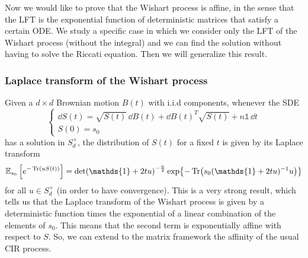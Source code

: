  Now we would like to prove that the Wishart process is affine, in the sense that the LFT is the exponential function of deterministic matrices that satisfy a certain ODE. We study a specific case in which we consider only the LFT of the Wishart process (without the integral) and we can find the solution without having to solve the Riccati equation. Then we will generalize this result.\\

\subsubsection{Laplace transform of the Wishart process}
Given a $d\times d$ Brownian motion $B(t)$ with i.i.d components, whenever the SDE
\begin{equation}
    \begin{cases}
    \dd S(t) = \sqrt{S(t)}\,\dd B(t) + \dd B(t)^T\sqrt{S(t)} + n\mathds{1}\,\dd t \\
    S(0) = s_0
    \end{cases}
\end{equation}
has a solution in $S_d^+$, the distribution of $S(t)$ for a fixed $t$ is given by its Laplace transform
\begin{equation}\label{lapltrWis}
    \mathbb{E}_{s_0}\left[e^{-\Tr(uS(t))}\right] = \det(\mathds{1}+2tu)^{-\frac{n}{2}}\exp{-\Tr(s_0(\mathds{1}+2tu)^{-1}u)}
\end{equation}
for all $u\in S_d^+$ (in order to have convergence). This is a very strong result, which tells us that the Laplace transform of the Wishart process is given by a deterministic function times the exponential of a linear combination of the elements of $s_0$. This means that the second term is exponentially affine with respect to $S$. So, we can extend to the matrix framework the affinity of the usual CIR process.
